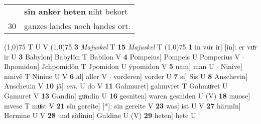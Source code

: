 \documentclass[8pt,a4paper,notitlepage]{article}
\begin{document}
\begin{table}[ht]
\begin{minipage}[t]{0.5\linewidth}
\begin{tabular}{rl}
 & \textbf{sîn anker} \textbf{heten} niht bekort\\ 
30 & ganzes landes noch landes ort.\\ 
\end{tabular}
\scriptsize
\line(1,0){75} \newline
T U V \newline
\line(1,0){75} \newline
\textbf{3} \textit{Majuskel} T  \textbf{15} \textit{Majuskel} T  \newline
\line(1,0){75} \newline
\textbf{1} in vür ir] [in]: er vuͦr ir U \textbf{3} Babylon] Babylôn T Babilon V \textbf{4} Pompeius] Pompeis U Pomperius V  $\cdot$ Ihpomidon] Jchpomidôn T Jpomidon U ẏpomidon V \textbf{5} nam] man U  $\cdot$ Ninive] ninivê T Niniue U V \textbf{6} al] aller V  $\cdot$ vorderen] vorder U \textbf{7} si] Sis U \textbf{8} Anschevin] Anscheuin V \textbf{10} jâ] \textit{om.} U do V \textbf{11} Gahmuret] gahmvret T Gahmuͦret U Gamuret V \textbf{13} Gandin] guͦndin U \textbf{16} gesniten] waren gesniden U (V) \textbf{18} muose] mvese T muͤst V \textbf{21} sîn gereite] [*]: sin gereite V \textbf{23} was] ist U V \textbf{27} härmîn] Hermine U V \textbf{28} und sîdîniu] Guldine U (V) \textbf{29} heten] hete U \newline
\end{minipage}
\end{table}
\end{document}
